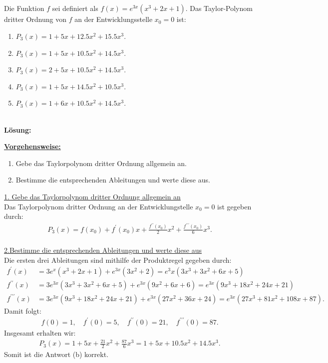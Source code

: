 \subsection*{}
Die Funktion $f$ sei definiert als $f(x) = e^{3x} (x^3 +2x +1)$. 
Das Taylor-Polynom dritter Ordnung von $f$ an der Entwicklungsstelle $x_0 = 0$ ist:
\renewcommand{\labelenumi}{(\alph{enumi})}
\begin{enumerate}
	\item 
	$P_3(x) = 1 + 5x + 12.5 x^2 + 15.5 x^3 $.
	\item 
	$P_3(x) = 1 + 5x + 10.5 x^2 + 14.5 x^3 $.
	\item
	$P_3(x) = 2 + 5x + 10.5 x^2 + 14.5 x^3 $.
	\item
	$P_3(x) = 1 + 5x + 14.5 x^2 + 10.5 x^3 $.
	\item
	$P_3(x) = 1 + 6x + 10.5 x^2 + 14.5 x^3 $.
\end{enumerate}
\ \\
\textbf{Lösung:}
\begin{mdframed}
\underline{\textbf{Vorgehensweise:}}
\renewcommand{\labelenumi}{\theenumi.}
\begin{enumerate}
\item Gebe das Taylorpolynom dritter Ordnung allgemein an.
\item Bestimme die entsprechenden Ableitungen und werte diese aus.
\end{enumerate}
\end{mdframed}

\underline{1. Gebe das Taylorpolynom dritter Ordnung allgemein an}\\
Das Taylorpolynom dritter Ordnung an der Entwicklungstelle $x_0 = 0$ ist gegeben durch:
\begin{align*}
	P_3(x)
	=
	f(x_0)
	+
	f^{\prime}(x_0)x
	+
	\frac{f^{\prime \prime}(x_0)}{2} x^2
	+
	\frac{f^{\prime \prime \prime } (x_0) }{6} x^3.	
\end{align*}
\ \\
\underline{2.Bestimme die entsprechenden Ableitungen und werte diese aus}\\
Die ersten drei Ableitungen sind mithilfe der Produktregel gegeben durch:
\begin{align*}
	f^\prime(x) 
	&= 
	3e^{x} (x^3 + 2x +1 ) + e^{3x}( 3x^2 + 2 )
	= 
	e^3x (3x^3 +3x^2 + 6x  + 5)\\
	f^{\prime \prime }(x)
	&= 
	3 e^{3x} (3x^3 + 3x^2 + 6x +5 )
	+
	e^{3x}(9x^2 + 6x + 6)
	=
	e^{3x}(9x^3 + 18 x^2 + 24 x +21)\\
	f^{\prime \prime \prime} (x)
	&=
	3 e^{3x} ( 9x^3 +18 x^2 +24 x +21)
	+
	e^{3x}(27 x^2 + 36 x +24)
	=
	e^{3x} (27 x^3 + 81 x^2 + 108 x+ 87).
\end{align*}
Damit folgt:
\begin{align*}
	f(0) = 1, \quad
	f^\prime(0) = 5, \quad
	f^{\prime \prime}(0) = 21, \quad
	f^{\prime \prime \prime} ( 0) = 87.
\end{align*}
Insgesamt erhalten wir:
\begin{align*}
	P_3(x)
	=
	1 + 5 x + 
	\frac{21}{2} x^2
	+
	\frac{87}{6} x^3
	=
	1 + 5x +10.5 x^2 + 14.5 x^3.
\end{align*}
Somit ist die Antwort (b) korrekt.

